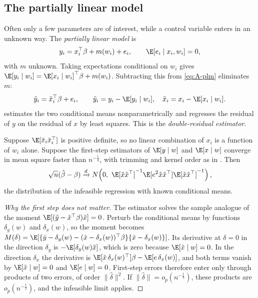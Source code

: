 \subsection{The partially linear model}\label{sec:A-plm}

Often only a few parameters are of interest, while a control variable enters in an unknown way. The
\emph{partially linear model} is
\begin{equation}\label{eq:A-plm}
y_i=x_i^\top\beta+m(w_i)+e_i,\qquad \E[e_i\mid x_i,w_i]=0,
\end{equation}
with $m$ unknown. Taking expectations conditional on $w_i$ gives
$\E[y_i\mid w_i]=\E[x_i\mid w_i]^\top\beta+m(w_i)$. Subtracting this from \eqref{eq:A-plm} eliminates
$m$:
\begin{equation}\label{eq:A-robinson}
\tilde y_i=\tilde x_i^\top\beta+e_i,\qquad \tilde y_i=y_i-\E[y_i\mid w_i],\quad \tilde x_i=x_i-\E[x_i\mid w_i].
\end{equation}
\citet{Robinson1988} estimates the two conditional means nonparametrically and regresses the
residual of $y$ on the residual of $x$ by least squares. This is the \emph{double-residual estimator}.

\begin{proposition}\label{prop:A-robinson}
Suppose $\E[\tilde x_i\tilde x_i^\top]$ is positive definite, so no linear combination of $x_i$ is a
function of $w_i$ alone. Suppose the first-step estimators of $\E[y\mid w]$ and $\E[x\mid w]$ converge
in mean square faster than $n^{-\frac{1}{4}}$, with trimming and kernel order as in
\citet{Robinson1988}. Then
\begin{equation*}
\sqrt n(\hat\beta-\beta)\xrightarrow{d}N\!\left(0,\ \E[\tilde x\tilde x^\top]^{-1}\E[e^2\tilde x\tilde x^\top]\E[\tilde x\tilde x^\top]^{-1}\right),
\end{equation*}
the distribution of the infeasible regression with known conditional means.
\end{proposition}

\begin{proof}[Why the first step does not matter]
The estimator solves the sample analogue of the moment
$\E[(\tilde y-\tilde x^\top\beta)\tilde x]=0$. Perturb the conditional means by functions $\delta_y(w)$
and $\delta_x(w)$, so the moment becomes
$M(\delta)=\E[\{\tilde y-\delta_y(w)-(\tilde x-\delta_x(w))^\top\beta\}\{\tilde x-\delta_x(w)\}]$. Its
derivative at $\delta=0$ in the direction $\delta_y$ is $-\E[\delta_y(w)\tilde x]$, which is zero because
$\E[\tilde x\mid w]=0$. In the direction $\delta_x$ the derivative is
$\E[\tilde x\,\delta_x(w)^\top]\beta-\E[e\,\delta_x(w)]$, and both terms vanish by
$\E[\tilde x\mid w]=0$ and $\E[e\mid w]=0$. First-step errors therefore enter only through products of
two errors, of order $\|\hat\delta\|^2$. If $\|\hat\delta\|=o_p(n^{-\frac{1}{4}})$, these products are
$o_p(n^{-\frac{1}{2}})$, and the infeasible limit applies.
\end{proof}

